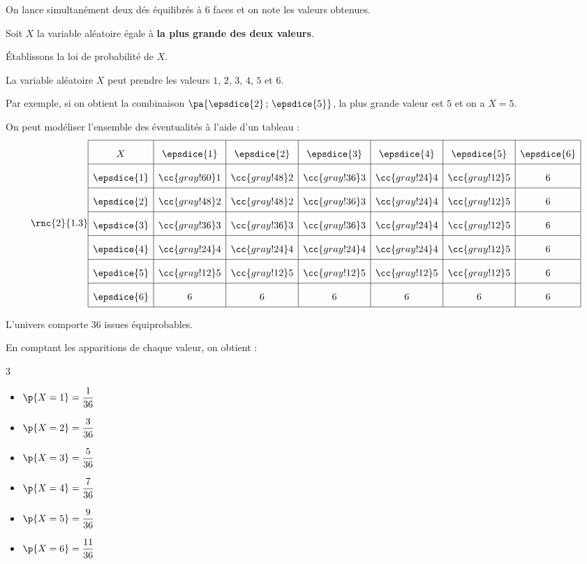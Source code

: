 \begin{methode}
	On lance simultanément deux dés équilibrés à $6$ faces et on note les valeurs obtenues.

	Soit $X$ la variable aléatoire égale à \textbf{la plus grande des deux valeurs}.

	Établissons la loi de probabilité de $X$.

	\begin{correction}
		La variable aléatoire $X$ peut prendre les valeurs $1$, $2$, $3$, $4$, $5$ et $6$.

		Par exemple, si on obtient la combinaison $\pa{\epsdice{2}\,;\,\epsdice{5}}$, la plus grande valeur est $5$ et on a $X=5$.

		On peut modéliser l'ensemble des éventualités à l'aide d'un tableau :
		\[
			\rnc{\arraystretch}{1.3}
			\begin{array}{|c|c|c|c|c|c|c|}\hline
				X           & \epsdice{1}    & \epsdice{2}    & \epsdice{3}    & \epsdice{4}    & \epsdice{5}    & \epsdice{6} \\ \hline
				\epsdice{1} & \cc{gray!60} 1 & \cc{gray!48} 2 & \cc{gray!36} 3 & \cc{gray!24} 4 & \cc{gray!12} 5 & 6           \\ \hline
				\epsdice{2} & \cc{gray!48} 2 & \cc{gray!48} 2 & \cc{gray!36} 3 & \cc{gray!24} 4 & \cc{gray!12} 5 & 6           \\ \hline
				\epsdice{3} & \cc{gray!36} 3 & \cc{gray!36} 3 & \cc{gray!36} 3 & \cc{gray!24} 4 & \cc{gray!12} 5 & 6           \\ \hline
				\epsdice{4} & \cc{gray!24} 4 & \cc{gray!24} 4 & \cc{gray!24} 4 & \cc{gray!24} 4 & \cc{gray!12} 5 & 6           \\ \hline
				\epsdice{5} & \cc{gray!12} 5 & \cc{gray!12} 5 & \cc{gray!12} 5 & \cc{gray!12} 5 & \cc{gray!12} 5 & 6           \\ \hline
				\epsdice{6} & 6              & 6              & 6              & 6              & 6              & 6           \\ \hline
			\end{array}
		\]

		L'univers comporte $36$ issues équiprobables.

		En comptant les apparitions de chaque valeur, on obtient :
		\begin{multicols}{3}
			\begin{itemize}
				\item $\p{X=1} = \dfrac{1}{36}$
				\item $\p{X=2} = \dfrac{3}{36}$
				\item $\p{X=3} = \dfrac{5}{36}$
				\item $\p{X=4} = \dfrac{7}{36}$
				\item $\p{X=5} = \dfrac{9}{36}$
				\item $\p{X=6} = \dfrac{11}{36}$
			\end{itemize}
		\end{multicols}


\end{correction}
\end{methode}
